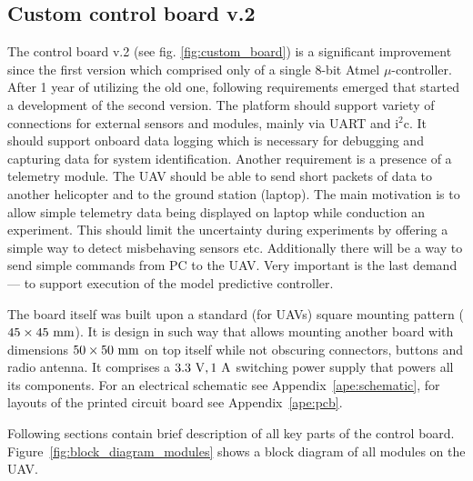 \subsection{Custom control board v.2}

The control board v.2 (see fig. \ref{fig:custom_board}) is a significant improvement since the first version \citep{baca2013} which comprised only of a single 8-bit Atmel $\mu$-controller. After 1 year of utilizing the old one, following requirements emerged that started a development of the second version. The platform should support variety of connections for external sensors and modules, mainly via UART and $\mathrm{i}^2\mathrm{c}$. It should support onboard data logging which is necessary for debugging and capturing data for system identification. Another requirement is a presence of a telemetry module. The UAV should be able to send short packets of data to another helicopter and to the ground station (laptop). The main motivation is to allow simple telemetry data being displayed on laptop while conduction an experiment. This should limit the uncertainty during experiments by offering a simple way to detect misbehaving sensors etc. Additionally there will be a way to send simple commands from PC to the UAV. Very important is the last demand --- to support execution of the model predictive controller.

The board itself was built upon a standard (for UAVs) square mounting pattern ($45\times 45~\mathrm{mm}$). It is design in such way that allows mounting another board with dimensions $50\times 50~\mathrm{mm}$ on top itself while not obscuring connectors, buttons and radio antenna. It comprises a $3.3~\mathrm{V}, 1~\mathrm{A}$ switching power supply that powers all its components. For an electrical schematic see Appendix~\ref{ape:schematic}, for layouts of the printed circuit board see Appendix~\ref{ape:pcb}.

 Following sections contain brief description of all key parts of the control board. Figure~\ref{fig:block_diagram_modules} shows a block diagram of all modules on the UAV.

